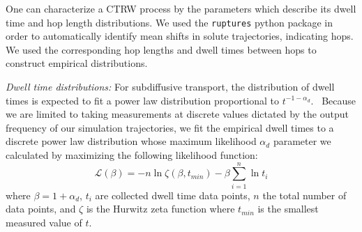 \documentclass{article}
\begin{document}
  One can characterize a CTRW process by the parameters which describe its dwell 
  time and hop length distributions. We used the \texttt{ruptures} python package in 
  order to automatically identify mean shifts in solute trajectories, indicating hops.\cite{truong_ruptures:_2018} 
  We used the corresponding hop lengths and dwell times between hops to construct 
  empirical distributions.
  
  \textit{Dwell time distributions:} For subdiffusive transport, the distribution 
  of dwell times is expected to fit a power law distribution 
  proportional to $t^{-1-\alpha_d}$.~\cite{meroz_toolbox_2015}
  Because we are limited to taking measurements at discrete values dictated by the output 
  frequency of our simulation trajectories, we fit the empirical dwell times
  to a discrete power law distribution whose maximum likelihood $\alpha_d$ 
  parameter we calculated by maximizing the following likelihood function: 
  \begin{equation}
	\mathcal{L}(\beta) = -n\ln \zeta(\beta, t_{min}) -
	\beta\sum_{i=1}^{n} \ln t_i 
  \label{eqn:powerlaw_likelihood}
  \end{equation}
  where $\beta = 1 + \alpha_d$, $t_i$ are collected dwell time data points,
  $n$ the total number of data points, and $\zeta$ is the Hurwitz zeta function
  where $t_{min}$ is the smallest measured value of	$t$.~\cite{clauset_power-law_2009}
  
\end{document}
